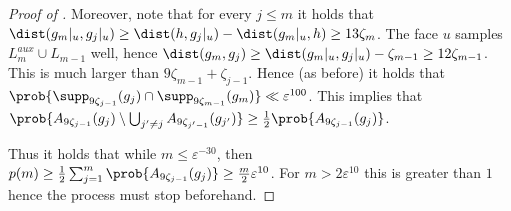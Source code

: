 \begin{proof}[Proof of ]
    Moreover, note that for every \(j \leq m\) it holds that \(\dist(g_{m}|_u,g_j|_u)\geq \dist(h,g_j|_u)-\dist(g_{m}|_u,h) \geq 13\zeta_{m}\). The face \(u\) samples \(L^{aux}_{m} \cup L_{m-1}\) well, hence \(\dist(g_{m},g_j) \geq \dist(g_{m}|_u,g_j|_u) - \zeta_{m-1} \geq 12\zeta_{m-1}\). This is much larger than \(9\zeta_{m-1} + \zeta_{j-1}\). Hence (as before) it holds that \(\prob{\supp_{9\zeta_{j-1}}(g_j) \cap \supp_{9\zeta_{m-1}}(g_{m})} \ll \varepsilon^{100}\). This implies that \(\prob{A_{9\zeta_{j-1}}(g_j) \setminus \bigcup_{j' \ne j} A_{9 \zeta_{j'-1}}(g_{j'})} \geq \frac{1}{2} \prob{A_{9\zeta_{j-1}}(g_j)}\).
    
    Thus it holds that while \(m \leq \varepsilon^{-30}\), then \(p(m) \geq \frac{1}{2}\sum_{j=1}^m \prob{A_{9\zeta_{j-1}}(g_j)} \geq \frac{m}{2}\varepsilon^{10}\). For \(m > 2\varepsilon^{10}\) this is greater than \(1\) hence the process must stop beforehand.
\end{proof}